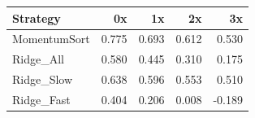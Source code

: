 \begin{tabular}{lrrrr}
\toprule
Strategy & 0x & 1x & 2x & 3x \\
\midrule
MomentumSort & 0.775 & 0.693 & 0.612 & 0.530 \\
Ridge\_All & 0.580 & 0.445 & 0.310 & 0.175 \\
Ridge\_Slow & 0.638 & 0.596 & 0.553 & 0.510 \\
Ridge\_Fast & 0.404 & 0.206 & 0.008 & -0.189 \\
\bottomrule
\end{tabular}
